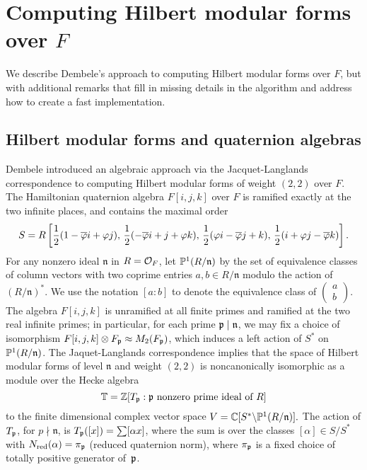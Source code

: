\documentclass{amsart}
\newcommand{\n}{\mathfrak{n}}
\begin{document}
\section{Computing Hilbert modular forms over $F$}\label{sec:hmf}

We describe Dembele's approach to computing Hilbert modular forms over
$F$, but with additional remarks that fill in missing details in the
algorithm and address how to create a fast implementation.

\subsection{Hilbert modular forms and quaternion 
algebras}\label{sec:dembele}
Dembele \cite{dembele:hilbert5} introduced an algebraic approach via
the Jacquet-Langlands correspondence to computing Hilbert modular
forms of weight $(2,2)$ over $F$.  The Hamiltonian quaternion algebra
$F[i,j,k]$ over $F$ is ramified exactly at the two infinite places,
and contains the maximal order
$$
 S = R\left[\frac{1}{2}(1-\overline{\varphi} i + \varphi j),\,
       \frac{1}{2}(-\overline{\varphi} i + j + \varphi k),\,
       \frac{1}{2}(\varphi i - \overline{\varphi} j + k), \,
       \frac{1}{2}(i + \varphi j - \overline{\varphi} k)\right].
$$
For any nonzero ideal $\n$ in $R=\mathcal{O}_F$,
let $\P^1(R/\n)$ by the set of equivalence classes of
 column vectors with two coprime entries $a,b \in R/\n$ modulo the
 action of $(R/\n)^*$.  We use the notation $[a:b]$
to denote the equivalence class of 
$\left(\begin{smallmatrix}a\\b\end{smallmatrix}\right)$.
The algebra $F[i,j,k]$ is unramified at all finite primes and ramified
at the two real infinite primes; in
particular, for each prime $\p\mid \n$, we may fix a choice of isomorphism
$F[i,j,k]\otimes F_{\mathfrak{p}} \approx M_2(F_{\mathfrak{p}})$, which induces a left
action of $S^*$ on $\P^1(R/\n)$. The Jaquet-Langlands correspondence implies that
the space of Hilbert modular forms of level $\n$ and weight $(2,2)$ is
noncanonically isomorphic as a module over the Hecke algebra
$$\mathbb{T}=\mathbb{Z}[T_{\mathfrak{p}} :  \mathfrak{p} \text{ nonzero prime ideal of }R]$$ 
to the finite dimensional complex vector space $ V = \C[S^* \backslash
\P^1(R/\n)].  $ The action of $T_{\mathfrak{p}}$, for $p\nmid \n$, is
$T_{\mathfrak{p}}([x]) = \sum [\alpha x]$, where the sum is over the classes
$[\alpha]\in S/S^*$ with $N_{\text{red}}(\alpha)=\pi_{\mathfrak{p}}$ (reduced quaternion norm),
where $\pi_{\mathfrak{p}}$ is a fixed choice of totally positive generator of~$\mathfrak{p}$.
\end{document}
